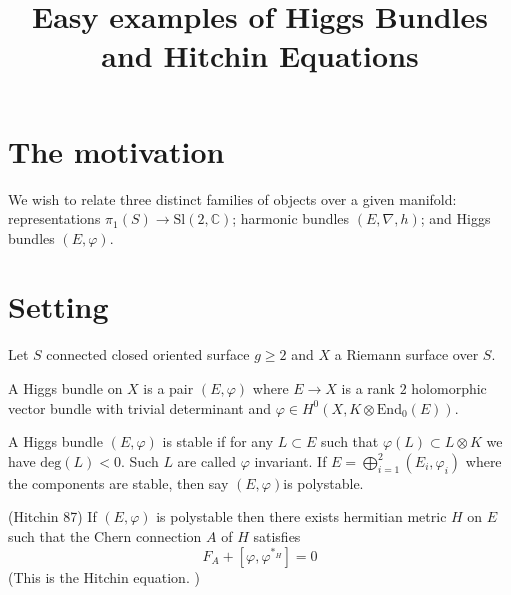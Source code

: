 % 

\title{Easy examples of Higgs Bundles and Hitchin Equations}
\author{}
\date{}

 
\maketitle
\Large
\section{The motivation} %

We wish to relate three distinct families of objects over a given manifold:
representations $ \pi_1 ( S) \rightarrow  \mathrm{Sl}(2, \mathbb{C} ) $;
harmonic bundles $ ( E, \nabla, h )$;
and Higgs bundles $(E, \varphi)$.



\section{Setting} %

Let $S$ connected closed oriented surface $ g \geq 2 $ and $X$ a Riemann surface over $ S$. 

\begin{definition}
    A Higgs bundle on $X$ is a pair $(E, \varphi)$ 
    where $E \rightarrow  X $ is a rank $2$ holomorphic vector bundle 
    with trivial determinant and $ \varphi \in H^0 ( X, K \otimes \mathrm{End} _0 (E) ) $.
\end{definition}

\begin{definition}
    A Higgs bundle $(E, \varphi)$ is stable if for any $L \subset E $ such that $ \varphi(L) \subset L \otimes K $ 
    we have $\mathrm{deg}(L) < 0 $. 
    Such $L$ are called $\varphi$ invariant.
    If $ E = \bigoplus_{i = 1} ^2  ( E_i , \varphi _i ) $ where the components are stable, then say $(E, \varphi)$is polystable.
\end{definition}

\begin{theorem}
 (Hitchin 87) 
    If $( E, \varphi) $ is polystable then there exists hermitian metric $H$ on $E$ such that the Chern connection $ A $ of $H$ satisfies 
    \begin{equation}
        F _A + [ \varphi , \varphi ^{*_H} ] = 0  
    \end{equation}
    (This is the Hitchin equation. ) 
\end{theorem}

